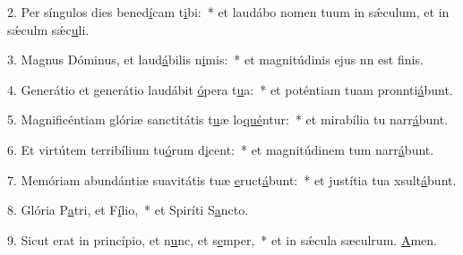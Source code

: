 2. Per síngulos dies bened\uline{í}cam t\uline{i}bi:~* et laudábo nomen tuum in sǽculum, et in sǽculm sǽc\uline{u}li.\par 
3. Magnus Dóminus, et laud\uline{á}bilis n\uline{i}mis:~* et magnitúdinis ejus nn est f\uline{i}nis.\par 
4. Generátio et generátio laudábit \uline{ó}pera t\uline{u}a:~* et poténtiam tuam pronnti\uline{á}bunt.\par 
5. Magnificéntiam glóriæ sanctitátis t\uline{u}æ lo\uline{qué}ntur:~* et mirabília tu narr\uline{á}bunt.\par 
6. Et virtútem terribílium tu\uline{ó}rum d\uline{i}cent:~* et magnitúdinem tum narr\uline{á}bunt.\par 
7. Memóriam abundántiæ suavitátis tuæ \uline{e}ruct\uline{á}bunt:~* et justítia tua xsult\uline{á}bunt.\par 
8. Glória P\uline{a}tri, et F\uline{í}lio,~* et Spiríti S\uline{a}ncto.\par 
9. Sicut erat in princípio, et n\uline{u}nc, et s\uline{e}mper,~* et in sǽcula sæculrum. \uline{A}men.\par 
